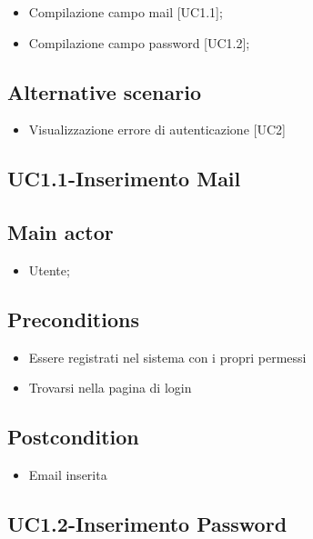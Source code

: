 \documentclass{article}
\begin{document}
        \begin{itemize}
            \item Compilazione campo mail [UC1.1];
            \item Compilazione campo password [UC1.2];
        \end{itemize}
            
        \subsection*{Alternative scenario}
            \begin{itemize}
                \item Visualizzazione errore di autenticazione [UC2]
            \end{itemize}
            
\subsection{UC1.1-Inserimento Mail}
    
     \subsection*{Main actor}
         \begin{itemize}
             \item Utente;
         \end{itemize}
     \subsection*{Preconditions} 
        \begin{itemize}
            \item Essere registrati nel sistema con i propri permessi
            \item Trovarsi nella pagina di login
        \end{itemize}
        \subsection*{Postcondition} 
        \begin{itemize}
            \item Email inserita
        \end{itemize}

\subsection{UC1.2-Inserimento Password}
    
\end{document}
